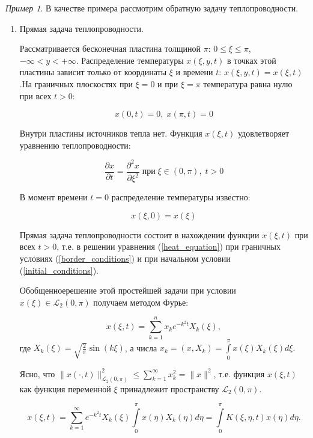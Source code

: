 \documentclass[12pt,a4paper,titlepage,oneside]{book}
\theoremstyle{definition}
\theoremstyle{plain}
\theoremstyle{remark}
\theoremstyle{remark}
\newtheorem*{example}{Пример}
\theoremstyle{remark}
\theoremstyle{remark}
\theoremstyle{plain}
\theoremstyle{plain}
\begin{document}
\begin{example}
В качестве примера рассмотрим обратную задачу теплопроводности.

\begin{enumerate}

\item Прямая задача теплопроводности.

Рассматривается бесконечная пластина толщиной $\pi$: $0 \leqslant \xi \leqslant\pi$, $-\infty < y < +\infty$. Распределение температуры $x(\xi, y, t)$ в точках этой пластины зависит только от координаты $\xi$ и времени $t$: $x(\xi, y, t) = x(\xi, t)$.На граничных плоскостях при $\xi = 0$ и при $\xi = \pi$ температура равна нулю при всех $t > 0$:

\begin{equation}
\label{border_conditions}
x(0, t) = 0,\;  x(\pi, t) = 0
\end{equation}

Внутри пластины источников тепла нет. Функция $x(\xi, t)$ удовлетворяет уравнению теплопроводности:

\begin{equation}
\label{heat_equation}
\frac{\partial x}{\partial t} = \frac{\partial^2 x}{\partial \xi^2} \;  \mbox{при} \;   \xi \in (0, \pi),\;  t > 0
\end{equation}

В момент времени $t = 0$ распределение температуры известно: 

\begin{equation}
\label{initial_conditions}
x(\xi,0)=x(\xi)
\end{equation}

Прямая задача теплопроводности состоит в нахождении функции $x(\xi,t)$ при всех $t >0$, т.е. в решении уравнения (\ref{heat_equation}) при граничных условиях (\ref{border_conditions}) и при начальном условии (\ref{initial_conditions}).

\guillemotleft Обобщенное\guillemotright \;решение этой простейшей задачи при условии $x(\xi) \in \mathcal{L}_2(0, \pi)$ получаем методом Фурье:
\begin{center}
$$x(\xi,t) = \displaystyle\sum\limits_{k=1}^n x_k e^{-k^2t} X_k(\xi),$$ где $X_k(\xi) = \sqrt{\frac{2}{\pi}} \sin (k\xi)$, а числа $x_k = (x,X_k) = \displaystyle\int\limits_0^\pi x(\xi) X_k(\xi) d\xi\mbox{.}$
\end{center}

Ясно, что $\|x(\cdot, t)\|_{\mathcal{L}_2 (0, \pi)}^{2} \leqslant \displaystyle\sum\limits_{k=1}^{\infty}x_k^2=\|x\|^2$, т.е. функция $x(\xi,t)$ как функция переменной $\xi$ принадлежит пространству $\mathcal{L}_2 (0, \pi)$.
\begin{center}
$$x(\xi, t) = \displaystyle\sum\limits_{k=1}^{\infty} e^{-k^2 t} X_k(\xi) \int\limits_{0}^{\pi} x(\eta) X_k(\eta) d\eta = \int\limits_{0}^{\pi} K(\xi, \eta, t) x(\eta) d \eta \mbox{.}$$
\end{center}


\end{enumerate}
\end{example}
\end{document}
